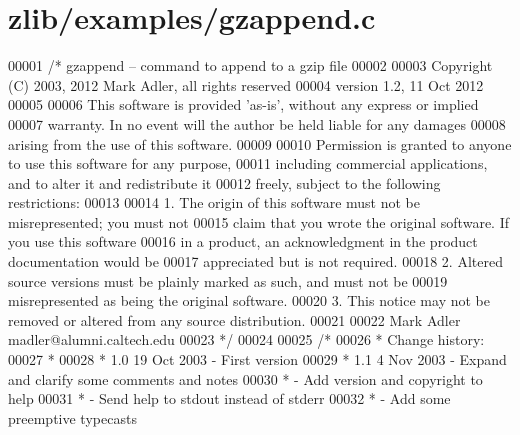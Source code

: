\hypertarget{zlib_2examples_2gzappend_8c_source}{}\section{zlib/examples/gzappend.c}
\label{zlib_2examples_2gzappend_8c_source}

\begin{DoxyCode}
00001 \textcolor{comment}{/* gzappend -- command to append to a gzip file}
00002 \textcolor{comment}{}
00003 \textcolor{comment}{  Copyright (C) 2003, 2012 Mark Adler, all rights reserved}
00004 \textcolor{comment}{  version 1.2, 11 Oct 2012}
00005 \textcolor{comment}{}
00006 \textcolor{comment}{  This software is provided 'as-is', without any express or implied}
00007 \textcolor{comment}{  warranty.  In no event will the author be held liable for any damages}
00008 \textcolor{comment}{  arising from the use of this software.}
00009 \textcolor{comment}{}
00010 \textcolor{comment}{  Permission is granted to anyone to use this software for any purpose,}
00011 \textcolor{comment}{  including commercial applications, and to alter it and redistribute it}
00012 \textcolor{comment}{  freely, subject to the following restrictions:}
00013 \textcolor{comment}{}
00014 \textcolor{comment}{  1. The origin of this software must not be misrepresented; you must not}
00015 \textcolor{comment}{     claim that you wrote the original software. If you use this software}
00016 \textcolor{comment}{     in a product, an acknowledgment in the product documentation would be}
00017 \textcolor{comment}{     appreciated but is not required.}
00018 \textcolor{comment}{  2. Altered source versions must be plainly marked as such, and must not be}
00019 \textcolor{comment}{     misrepresented as being the original software.}
00020 \textcolor{comment}{  3. This notice may not be removed or altered from any source distribution.}
00021 \textcolor{comment}{}
00022 \textcolor{comment}{  Mark Adler    madler@alumni.caltech.edu}
00023 \textcolor{comment}{ */}
00024 
00025 \textcolor{comment}{/*}
00026 \textcolor{comment}{ * Change history:}
00027 \textcolor{comment}{ *}
00028 \textcolor{comment}{ * 1.0  19 Oct 2003     - First version}
00029 \textcolor{comment}{ * 1.1   4 Nov 2003     - Expand and clarify some comments and notes}
00030 \textcolor{comment}{ *                      - Add version and copyright to help}
00031 \textcolor{comment}{ *                      - Send help to stdout instead of stderr}
00032 \textcolor{comment}{ *                      - Add some preemptive typecasts}

\end{DoxyCode}
